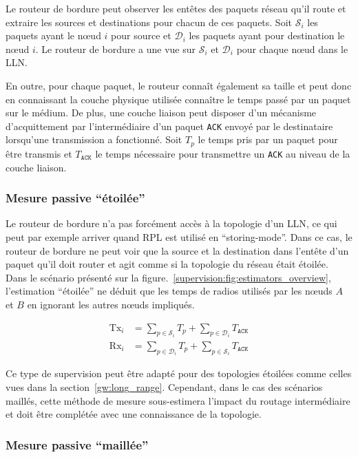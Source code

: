 Le routeur de bordure peut observer les entêtes des paquets réseau qu'il route et extraire les sources et destinations pour chacun de ces paquets.
Soit $\mathcal{S}_i$ les paquets ayant le nœud $i$ pour source et  $\mathcal{D}_i$ les paquets ayant pour destination le nœud $i$.
Le routeur de bordure a une vue sur $\mathcal{S}_i$ et $\mathcal{D}_i$ pour chaque nœud dans le \ac{LLN}.

En outre, pour chaque paquet, le routeur connaît également sa taille et peut donc en connaissant la couche physique utilisée connaître le temps passé par un paquet sur le médium.
De plus, une couche liaison peut disposer d'un mécanisme d'acquittement par l'intermédiaire d'un paquet \texttt{ACK} envoyé par le destinataire lorsqu'une transmission a fonctionné.
Soit $T_p$ le temps pris par un paquet pour être transmis et $T_{\texttt{ACK}}$ le temps nécessaire pour transmettre un \texttt{ACK} au niveau de la couche liaison.

\subsubsection{Mesure passive ``étoilée''}
\label{supervision:noinfo_estimator}

Le routeur de bordure n'a pas forcément accès à la topologie d'un \ac{LLN}, ce qui peut par exemple arriver quand \ac{RPL} est utilisé en ``storing-mode''.
Dans ce cas, le routeur de bordure ne peut voir que la source et la destination dans l'entête d'un paquet qu'il doit router et agit comme si la topologie du réseau était étoilée.
Dans le scénario présenté sur la figure.~\ref{supervision:fig:estimators_overview}, l'estimation ``étoilée'' ne déduit que les temps de radios utilisés par les nœuds $A$ et $B$ en ignorant les autres nœuds impliqués.

\begin{align}
  \textrm{Tx}_i &= \sum_{p \in \mathcal{S}_i}{T_p} + \sum_{p \in \mathcal{D}_i}{T_{\texttt{ACK}}}\\
  \textrm{Rx}_i &= \sum_{p \in \mathcal{D}_i}{T_p} + \sum_{p \in \mathcal{S}_i}{T_{\texttt{ACK}}}
\end{align}

Ce type de supervision peut être adapté pour des topologies étoilées comme celles vues dans la section~\ref{gw:long_range}.
Cependant, dans le cas des scénarios maillés, cette méthode de mesure sous-estimera l'impact du routage intermédiaire et doit être complétée avec une connaissance de la topologie.

\subsubsection{Mesure passive ``maillée''}
\label{supervision:route_estimator}

